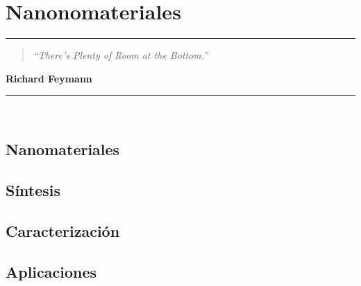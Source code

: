 \chapter{\label{cap:Nanomateriales} Nanonomateriales}

\noindent
\rule{\linewidth}{1 pt}
\begin{flushright}
\begin{quotation}
\small{
\textit{``There’s Plenty of Room at the Bottom.''}}
\end{quotation}
\bf{Richard Feymann}
\end{flushright}
\noindent
\rule{\linewidth}{1 pt}\\
\vspace{1cm}


\section{\label{cap:Nanomateriales:sec:nanomateriales}Nanomateriales}

\section{\label{cap:Nanomateriales:sec:sintesis}Síntesis}

\section{\label{cap:Nanomateriales:sec:caracterizacion}Caracterización}

\section{\label{cap:Nanomateriales:sec:aplicaciones}Aplicaciones}
